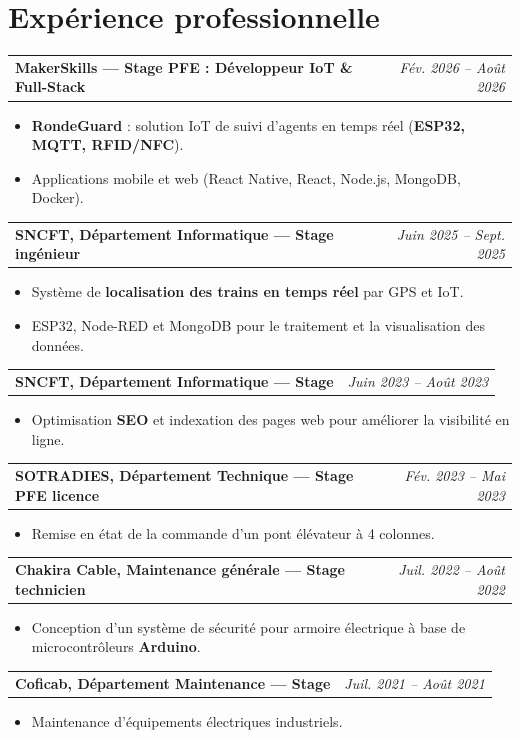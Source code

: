 \documentclass[10pt,a4paper]{article}
\makeatletter
\newcommand{\cvhead}[2]{%
  \noindent\begin{tabularx}{\linewidth}{@{}X r@{}}
    \textbf{#1} & \textit{\small #2}\\
  \end{tabularx}\vspace{1pt}%
}
\makeatother
\begin{document}
\section{Expérience professionnelle}

\cvhead{MakerSkills --- Stage PFE : Développeur IoT \& Full-Stack}{Fév. 2026 -- Août 2026}
\begin{itemize}
  \item \textbf{RondeGuard} : solution IoT de suivi d'agents en temps réel (\textbf{ESP32, MQTT, RFID/NFC}).
  \item Applications mobile et web (React Native, React, Node.js, MongoDB, Docker).
\end{itemize}

\cvhead{SNCFT, Département Informatique --- Stage ingénieur}{Juin 2025 -- Sept. 2025}
\begin{itemize}
  \item Système de \textbf{localisation des trains en temps réel} par GPS et IoT.
  \item ESP32, Node-RED et MongoDB pour le traitement et la visualisation des données.
\end{itemize}

\cvhead{SNCFT, Département Informatique --- Stage}{Juin 2023 -- Août 2023}
\begin{itemize}
  \item Optimisation \textbf{SEO} et indexation des pages web pour améliorer la visibilité en ligne.
\end{itemize}

\cvhead{SOTRADIES, Département Technique --- Stage PFE licence}{Fév. 2023 -- Mai 2023}
\begin{itemize}
  \item Remise en état de la commande d'un pont élévateur à 4 colonnes.
\end{itemize}

\cvhead{Chakira Cable, Maintenance générale --- Stage technicien}{Juil. 2022 -- Août 2022}
\begin{itemize}
  \item Conception d'un système de sécurité pour armoire électrique à base de microcontrôleurs \textbf{Arduino}.
\end{itemize}

\cvhead{Coficab, Département Maintenance --- Stage}{Juil. 2021 -- Août 2021}
\begin{itemize}
  \item Maintenance d'équipements électriques industriels.
\end{itemize}
\end{document}
